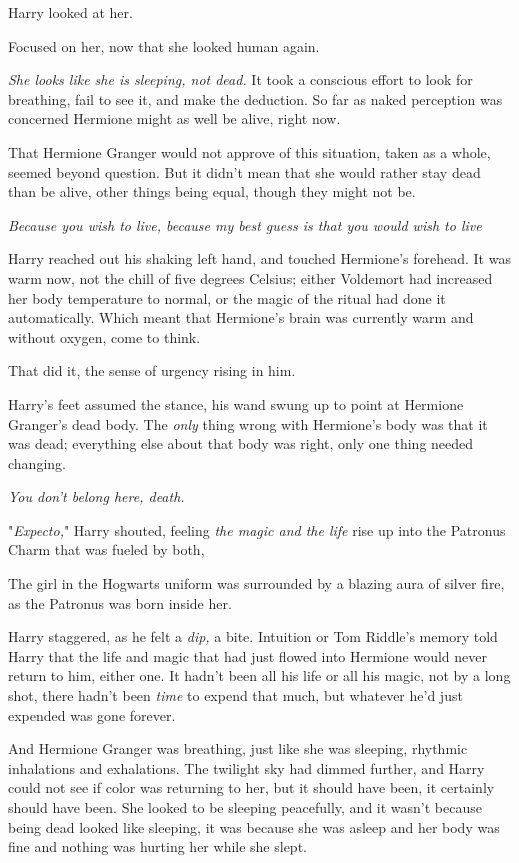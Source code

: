 Harry looked at her.

Focused on her, now that she looked human again.

\emph{She looks like she is sleeping, not dead.} It took a conscious effort to
look for breathing, fail to see it, and make the deduction. So far as naked
perception was concerned{\el} Hermione might as well be alive, right now.

That Hermione Granger would not approve of this situation, taken as a whole,
seemed beyond question. But it didn't mean that she would rather stay dead than
be alive, other things being equal, though they might not be.

\emph{Because you wish to live, because my best guess is that you would wish to
live{\el}}

Harry reached out his shaking left hand, and touched Hermione's forehead. It
was warm now, not the chill of five degrees Celsius; either Voldemort had
increased her body temperature to normal, or the magic of the ritual had done
it automatically. Which meant that Hermione's brain was currently warm and
without oxygen, come to think.

That did it, the sense of urgency rising in him.

Harry's feet assumed the stance, his wand swung up to point at Hermione
Granger's dead body. The \emph{only} thing wrong with Hermione's body was that
it was dead; everything else about that body was right, only one thing needed
changing.

\emph{You don't belong here, death.}

"\emph{Expecto,}" Harry shouted, feeling \emph{the magic and the life} rise up
into the Patronus Charm that was fueled by both, \emph{}

The girl in the Hogwarts uniform was surrounded by a blazing aura of silver
fire, as the Patronus was born inside her.

Harry staggered, as he felt a \emph{dip,} a bite. Intuition or Tom Riddle's
memory told Harry that the life and magic that had just flowed into Hermione
would never return to him, either one. It hadn't been all his life or all his
magic, not by a long shot, there hadn't been \emph{time} to expend that much,
but whatever he'd just expended was gone forever.

And Hermione Granger was breathing, just like she was sleeping, rhythmic
inhalations and exhalations. The twilight sky had dimmed further, and Harry
could not see if color was returning to her, but it should have been, it
certainly should have been. She looked to be sleeping peacefully, and it wasn't
because being dead looked like sleeping, it was because she was asleep and her
body was fine and nothing was hurting her while she slept.

